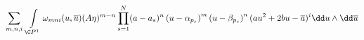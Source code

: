 \begin{equation}
\sum\limits_{m,n,i}\:\int\limits_{\C
P^1}\omega_{mni}(u, \overline{u})(A\eta )^{m-n}\prod_{s=1}^N
(a-a_s)^n\left(u-\alpha_{p_s}\right)^m\left(u-\beta_{p_s}\right)^n
(au^2+2bu-\overline{a})^i\dd u\wedge\dd\overline{u}
\label{mTNUTmegoldas}
\end{equation}

